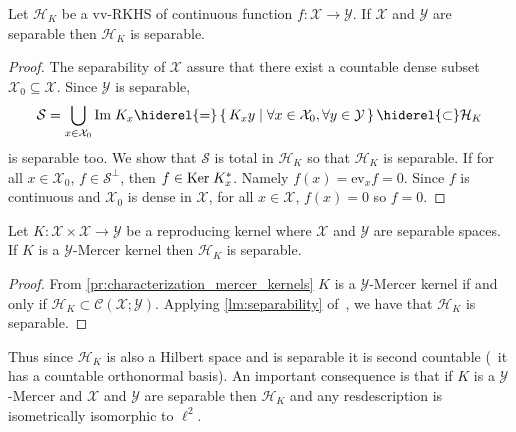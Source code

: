 \begin{lemma}
\label{lm:separability}
Let $\mathcal{H}_K$ be a \acl{vv-RKHS} of continuous function $f:\mathcal{X}\to\mathcal{Y}$. If $\mathcal{X}$ and $\mathcal{Y}$ are separable then $\mathcal{H}_K$ is separable.
\end{lemma}
\begin{proof}
The separability of $\mathcal{X}$ assure that there exist a countable dense subset $\mathcal{X}_0\subseteq\mathcal{X}$. Since $\mathcal{Y}$ is separable,
\begin{dmath*}
\mathcal{S}=\bigcup_{x\in\mathcal{X}_0}\Ima K_x \hiderel{=}\set{K_xy|\forall x\in\mathcal{X}_0, \forall y\in\mathcal{Y}}\hiderel{\subset} \mathcal{H}_K
\end{dmath*}
is separable too. We show that $\mathcal{S}$ is total in $\mathcal{H}_K$ so that $\mathcal{H}_K$ is separable. If for all $x\in\mathcal{X}_0$, $f\in\mathcal{S}^{\perp}$, then $f\in\text{Ker}\; K_x^*$. Namely $f(x)=\text{ev}_xf=0$. Since $f$ is continuous and $\mathcal{X}_0$ is dense in $\mathcal{X}$, for all $x\in\mathcal{X}$, $f(x)=0$ so $f=0$.
\end{proof}

\begin{proposition}
\label{pr:mercer_countable_basis}
Let $K:\mathcal{X}\times\mathcal{X}\to\mathcal{Y}$ be a reproducing kernel where $\mathcal{X}$ and $\mathcal{Y}$ are separable spaces. If $K$ is a $\mathcal{Y}$-Mercer kernel then $\mathcal{H}_K$ is separable.
\end{proposition}
\begin{proof}
From \cref{pr:characterization_mercer_kernels} $K$ is a $\mathcal{Y}$-Mercer kernel if and only if $\mathcal{H}_K\subset \mathcal{C}(\mathcal{X};\mathcal{Y})$. Applying \cref{lm:separability} of~\citet{carmeli2006vector}, we have that $\mathcal{H}_K$ is separable.
\end{proof}
Thus since $\mathcal{H}_K$ is also a Hilbert space and is separable it is second countable (\ie~it has a countable orthonormal basis). An important consequence is that if $K$ is a $\mathcal{Y}$-Mercer and $\mathcal{X}$ and $\mathcal{Y}$ are separable then $\mathcal{H}_K$ and any resdescription is isometrically isomorphic to $\ell^2$.

